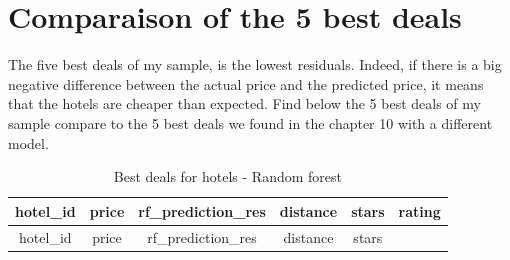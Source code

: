 \documentclass[
]{article}
\begin{document}
\hypertarget{comparaison-of-the-5-best-deals}{%
\section{Comparaison of the 5 best
deals}\label{comparaison-of-the-5-best-deals}}

The five best deals of my sample, is the lowest residuals. Indeed, if
there is a big negative difference between the actual price and the
predicted price, it means that the hotels are cheaper than expected.
Find below the 5 best deals of my sample compare to the 5 best deals we
found in the chapter 10 with a different model.

\begin{longtable}[]{@{}cccccc@{}}
\caption{Best deals for hotels - Random forest}\tabularnewline
\toprule
\begin{minipage}[b]{0.13\columnwidth}\centering
hotel\_id\strut
\end{minipage} & \begin{minipage}[b]{0.09\columnwidth}\centering
price\strut
\end{minipage} & \begin{minipage}[b]{0.23\columnwidth}\centering
rf\_prediction\_res\strut
\end{minipage} & \begin{minipage}[b]{0.13\columnwidth}\centering
distance\strut
\end{minipage} & \begin{minipage}[b]{0.09\columnwidth}\centering
stars\strut
\end{minipage} & \begin{minipage}[b]{0.10\columnwidth}\centering
rating\strut
\end{minipage}\tabularnewline
\midrule
\endfirsthead
\toprule
\begin{minipage}[b]{0.13\columnwidth}\centering
hotel\_id\strut
\end{minipage} & \begin{minipage}[b]{0.09\columnwidth}\centering
price\strut
\end{minipage} & \begin{minipage}[b]{0.23\columnwidth}\centering
rf\_prediction\_res\strut
\end{minipage} & \begin{minipage}[b]{0.13\columnwidth}\centering
distance\strut
\end{minipage} & \begin{minipage}[b]{0.09\columnwidth}\centering
stars\strut

\end{minipage}
\end{longtable}
\end{document}
